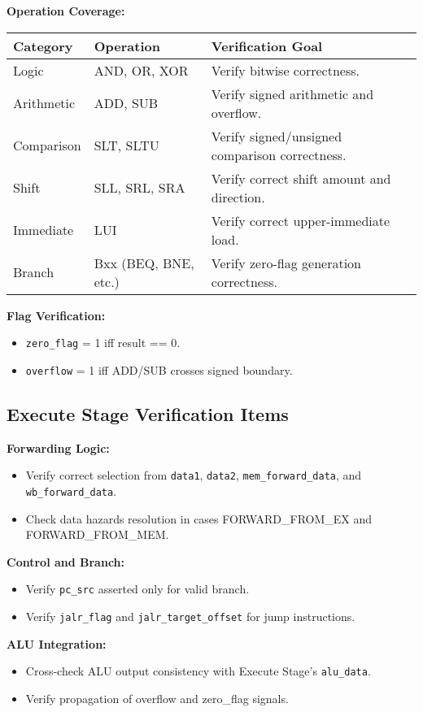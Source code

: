 \documentclass[a4paper,12pt]{article}
\begin{document}
\textbf{Operation Coverage:}
\begin{longtable}{@{}lll@{}}
\toprule
\textbf{Category} & \textbf{Operation} & \textbf{Verification Goal} \\ \midrule
Logic & AND, OR, XOR & Verify bitwise correctness. \\
Arithmetic & ADD, SUB & Verify signed arithmetic and overflow. \\
Comparison & SLT, SLTU & Verify signed/unsigned comparison correctness. \\
Shift & SLL, SRL, SRA & Verify correct shift amount and direction. \\
Immediate & LUI & Verify correct upper-immediate load. \\
Branch & Bxx (BEQ, BNE, etc.) & Verify zero-flag generation correctness. \\ \bottomrule
\end{longtable}
\textbf{Flag Verification:}
\begin{itemize}
    \item \texttt{zero\_flag} = 1 iff result == 0.
    \item \texttt{overflow} = 1 iff ADD/SUB crosses signed boundary.
\end{itemize}

\subsection{Execute Stage Verification Items}

\textbf{Forwarding Logic:}
\begin{itemize}
    \item Verify correct selection from \texttt{data1}, \texttt{data2}, \texttt{mem\_forward\_data}, and \texttt{wb\_forward\_data}.
    \item Check data hazards resolution in cases FORWARD\_FROM\_EX and FORWARD\_FROM\_MEM.
\end{itemize}
\textbf{Control and Branch:}
\begin{itemize}
    \item Verify \texttt{pc\_src} asserted only for valid branch.
    \item Verify \texttt{jalr\_flag} and \texttt{jalr\_target\_offset} for jump instructions.
\end{itemize}
\textbf{ALU Integration:}
\begin{itemize}
    \item Cross-check ALU output consistency with Execute Stage’s \texttt{alu\_data}.
    \item Verify propagation of overflow and zero\_flag signals.
\end{itemize}
\end{document}

